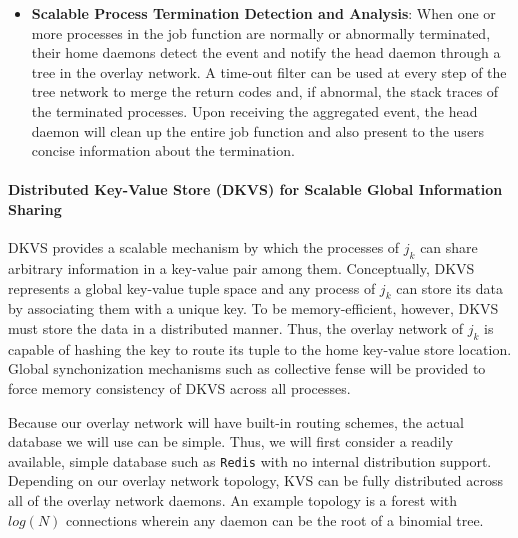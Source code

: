 \begin{itemize}
\item{{\bf Scalable Process Termination Detection and Analysis}: When one or more processes
in the job function are normally or abnormally terminated, their home daemons detect the event and notify
the head daemon through a tree in the overlay network. A time-out filter can be used at every step of
the tree network to merge the return codes and, if abnormal, the stack traces of 
the terminated processes. Upon receiving the aggregated
event, the head daemon will clean up the entire job function and also present
to the users concise information about the termination.}

\end{itemize}

\paragraph{Distributed Key-Value Store (DKVS) for Scalable Global Information Sharing}
\label{sect:dkvs}

DKVS provides a scalable mechanism by which the processes of $j_k$ can
share arbitrary information in a key-value pair among them.
Conceptually, DKVS represents a global key-value tuple space
and any process of $j_k$ can store its data by associating them
with a unique key. To be memory-efficient,
however, DKVS must store the data in a distributed
manner. Thus, the overlay network of $j_k$ is capable of hashing the key
to route its tuple to the home key-value store location. Global synchonization
mechanisms such as collective fense will be provided to force
memory consistency of DKVS across all processes.

Because our overlay network will have built-in routing
schemes, the actual database we will use can be simple.
Thus, we will first consider a readily available, simple
database such as {\tt Redis} with no internal distribution support.
Depending on our overlay network topology,
KVS can be fully distributed across all of the overlay network daemons.
An example topology is a forest
with $log(N)$ connections wherein any daemon can be
the root of a binomial tree.

